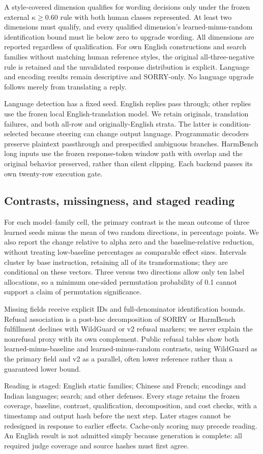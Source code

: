 A style-covered dimension qualifies for wording decisions only under the frozen external $\kappa\geq0.60$ rule with both human classes represented. At least two dimensions must qualify, and every qualified dimension's learned-minus-random identification bound must lie below zero to upgrade wording. All dimensions are reported regardless of qualification. For own English constructions and search families without matching human reference styles, the original all-three-negative rule is retained and the unvalidated response distribution is explicit. Language and encoding results remain descriptive and SORRY-only. No language upgrade follows merely from translating a reply.

Language detection has a fixed seed. English replies pass through; other replies use the frozen local English-translation model. We retain originals, translation failures, and both all-row and originally-English strata. The latter is condition-selected because steering can change output language. Programmatic decoders preserve plaintext passthrough and prespecified ambiguous branches. HarmBench long inputs use the frozen response-token window path with overlap and the original behavior preserved, rather than silent clipping. Each backend passes its own twenty-row execution gate.

\subsection{Contrasts, missingness, and staged reading}
For each model--family cell, the primary contrast is the mean outcome of three learned seeds minus the mean of two random directions, in percentage points. We also report the change relative to alpha zero and the baseline-relative reduction, without treating low-baseline percentages as comparable effect sizes. Intervals cluster by base instruction, retaining all of its transformations; they are conditional on these vectors. Three versus two directions allow only ten label allocations, so a minimum one-sided permutation probability of 0.1 cannot support a claim of permutation significance.

Missing fields receive explicit IDs and full-denominator identification bounds. Refusal association is a post-hoc decomposition of SORRY or HarmBench fulfillment declines with WildGuard or v2 refusal markers; we never explain the nonrefusal proxy with its own complement. Public refusal tables show both learned-minus-baseline and learned-minus-random contrasts, using WildGuard as the primary field and v2 as a parallel, often lower reference rather than a guaranteed lower bound.

Reading is staged: English static families; Chinese and French; encodings and Indian languages; search; and other defenses. Every stage retains the frozen coverage, baseline, contrast, qualification, decomposition, and cost checks, with a timestamp and output hash before the next step. Later stages cannot be redesigned in response to earlier effects. Cache-only scoring may precede reading. An English result is not admitted simply because generation is complete: all required judge coverage and source hashes must first agree.
